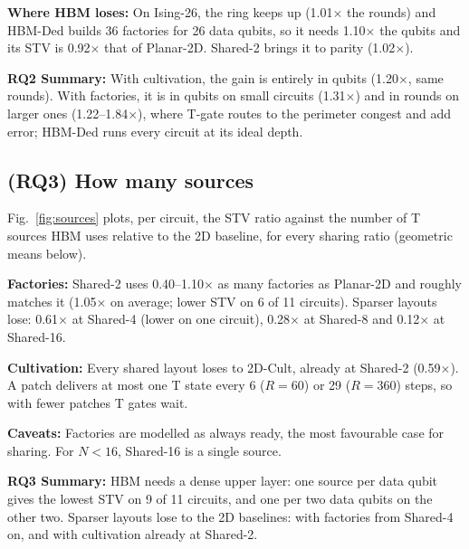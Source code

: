 \textbf{Where HBM loses:} On Ising-26, the ring keeps up (1.01$\times$ the rounds) and
HBM-Ded builds 36 factories for 26 data qubits, so it needs 1.10$\times$ the qubits and its
STV is 0.92$\times$ that of Planar-2D. Shared-2 brings it to parity (1.02$\times$).

\begin{rqsummary}
\textbf{RQ2 Summary:} With cultivation, the gain is entirely in qubits (1.20$\times$, same
rounds). With factories, it is in qubits on small circuits (1.31$\times$) and in rounds on
larger ones (1.22--1.84$\times$), where T-gate routes to the perimeter congest and add error;
HBM-Ded runs every circuit at its ideal depth.
\end{rqsummary}


\subsection{(RQ3) How many sources}

Fig.~\ref{fig:sources} plots, per circuit, the STV ratio against the number of T sources
HBM uses relative to the 2D baseline, for every sharing ratio (geometric means below).

\textbf{Factories:} Shared-2 uses 0.40--1.10$\times$ as many factories as Planar-2D and
roughly matches it (1.05$\times$ on average; lower STV on 6 of 11 circuits). Sparser layouts
lose: 0.61$\times$ at Shared-4 (lower on one circuit), 0.28$\times$ at Shared-8 and
0.12$\times$ at Shared-16.

\textbf{Cultivation:} Every shared layout loses to 2D-Cult, already at Shared-2
(0.59$\times$). A patch delivers at most one T state every 6 ($R = 60$) or 29 ($R = 360$)
steps, so with fewer patches T gates wait.

\textbf{Caveats:} Factories are modelled as always ready, the most favourable case for
sharing. %
For $N < 16$, Shared-16 is a single source.

\begin{rqsummary}
\textbf{RQ3 Summary:} HBM needs a dense upper layer: one source per data qubit gives the
lowest STV on 9 of 11 circuits, and one per two data qubits on the other two. Sparser
layouts lose to the 2D baselines: with factories from Shared-4 on, and with cultivation
already at Shared-2.
\end{rqsummary}

